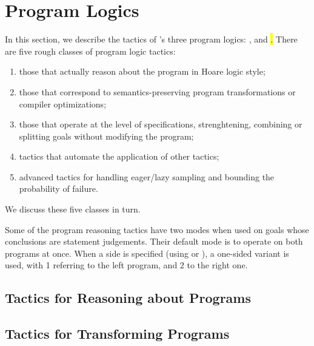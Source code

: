 \section{Program Logics}
\label{sec:programlogics}

In this section, we describe the tactics of \EasyCrypt's three program
logics: \prhl, \phl and \hl.  There are five rough classes of program
logic tactics:
\begin{enumerate}
\item those that actually reason about the program in Hoare logic
  style;

\item those that correspond to semantics-preserving program
  transformations or compiler optimizations;

\item those that operate at the level of specifications,
  strenghtening, combining or splitting goals without modifying the
  program;

\item tactics that automate the application of other tactics;

\item advanced tactics for handling eager/lazy sampling and bounding
  the probability of failure.
\end{enumerate}
We discuss these five classes in turn.

Some of the program reasoning tactics have two modes when used on
goals whose conclusions are \prhl statement judgements.  Their default
mode is to operate on both programs at once. When a side is specified
(using  or ), a one-sided variant is
used, with 1 referring to the left program, and 2 to the right one.

\subsection{Tactics for Reasoning about Programs}
\label{subsec:reasoningprograms}











\subsection{Tactics for Transforming Programs}
\label{subsec:transformingprograms}

